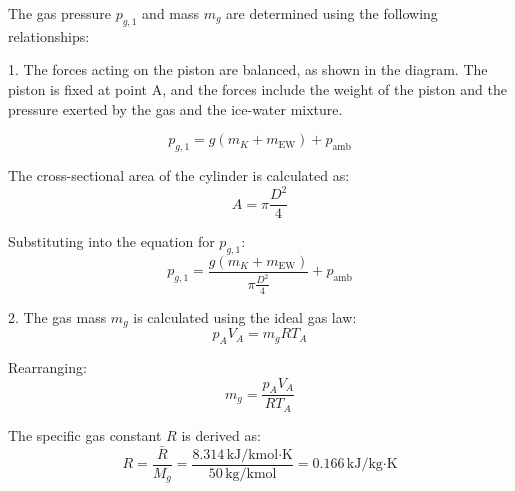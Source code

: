 The gas pressure \( p_{g,1} \) and mass \( m_g \) are determined using the following relationships:  

1. The forces acting on the piston are balanced, as shown in the diagram. The piston is fixed at point A, and the forces include the weight of the piston and the pressure exerted by the gas and the ice-water mixture.  

\[
p_{g,1} = g \left( m_K + m_{\text{EW}} \right) + p_{\text{amb}}
\]

The cross-sectional area of the cylinder is calculated as:  
\[
A = \pi \frac{D^2}{4}
\]

Substituting into the equation for \( p_{g,1} \):  
\[
p_{g,1} = \frac{g \left( m_K + m_{\text{EW}} \right)}{\pi \frac{D^2}{4}} + p_{\text{amb}}
\]

2. The gas mass \( m_g \) is calculated using the ideal gas law:  
\[
p_A V_A = m_g R T_A
\]

Rearranging:  
\[
m_g = \frac{p_A V_A}{R T_A}
\]

The specific gas constant \( R \) is derived as:  
\[
R = \frac{\bar{R}}{M_g} = \frac{8.314 \, \text{kJ/kmol·K}}{50 \, \text{kg/kmol}} = 0.166 \, \text{kJ/kg·K}
\]